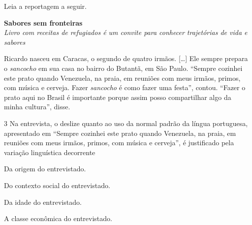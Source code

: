 Leia a reportagem a seguir.

\begin{myquote}
\begin{center}
\textbf{Sabores sem fronteiras}\\

\emph{Livro com receitas de refugiados é um convite para conhecer
trajetórias de vida e sabores}\\
\end{center}

\medskip

\noindent Ricardo nasceu em Caracas, o segundo de quatro irmãos. {[}\ldots{]} Ele
sempre prepara o \emph{sancocho} em sua casa no bairro do Butantã, em
São Paulo. ``Sempre cozinhei este prato quando Venezuela, na praia, em
reuniões com meus irmãos, primos, com música e cerveja. Fazer
\emph{sancocho} é como fazer uma festa'', contou. ``Fazer o prato aqui
no Brasil é importante porque assim posso compartilhar algo da minha
cultura'', disse.

\end{myquote}

\num{3} Na entrevista, o deslize quanto ao uso da normal padrão da língua
portuguesa, apresentado em ``Sempre cozinhei este prato quando
Venezuela, na praia, em reuniões com meus irmãos, primos, com música e
cerveja'', é justificado pela variação linguística decorrente

\begin{escolha}
\item Da origem do entrevistado.
\item Do contexto social do entrevistado.
\item Da idade do entrevistado.
\item A classe econômica do entrevistado.
\end{escolha}


